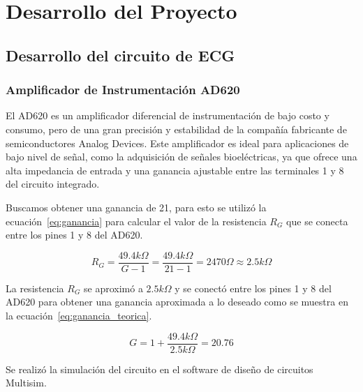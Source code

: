 \newpage
\section{Desarrollo del Proyecto}
    \subsection{Desarrollo del circuito de ECG}
        \subsubsection{Amplificador de Instrumentación AD620}
            El AD620 es un amplificador diferencial de instrumentación de bajo costo y consumo, pero de una gran precisión y estabilidad de la compañía fabricante de semiconductores Analog Devices. Este amplificador es ideal para aplicaciones de bajo nivel de señal, como la adquisición de señales bioeléctricas, ya que ofrece una alta impedancia de entrada y una ganancia ajustable entre las terminales 1 y 8 del circuito integrado.

            Buscamos obtener una ganancia de 21, para esto se utilizó la ecuación~\ref{eq:ganancia} para calcular el valor de la resistencia $R_G$ que se conecta entre los pines 1 y 8 del AD620.

            \begin{equation}
                \label{eq:resistencia}
                R_G = \frac{49.4 k\Omega}{G - 1} = \frac{49.4 k\Omega}{21 - 1} = 2470 \Omega \approx 2.5 k\Omega
            \end{equation}

            La resistencia $R_G$ se aproximó a $2.5 k\Omega$ y se conectó entre los pines 1 y 8 del AD620 para obtener una ganancia aproximada a lo deseado como se muestra en la ecuación~\ref{eq:ganancia_teorica}.

            \begin{equation}
                \label{eq:ganancia_teorica}
                G = 1 + \frac{49.4 k\Omega}{2.5 k\Omega} = 20.76
            \end{equation}

            Se realizó la simulación del circuito en el software de diseño de circuitos Multisim.

